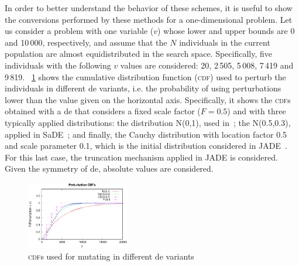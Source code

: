 \documentclass[review,3p]{elsarticle}
\newcommand{\DE}{{\sc de}}
\begin{document}
In order to better understand the behavior of these schemes, it is useful to show the conversions performed by these
methods for a one-dimensional problem.
%
Let us consider a problem with one variable ($v$) whose lower and upper bounds are 0 and 10$\,$000, respectively,
and assume that the $N$ individuals in the current population are almost equidistributed in the search space.
%
Specifically, five individuals with the following $v$ values are considered: 20, 2$\,$505, 5$\,$008, 7$\,$419 and 9$\,$819.
%
\figurename~\ref{fig:random_cdfs} shows the cumulative distribution function (\textsc{cdf}) used to perturb the individuals in different \DE{} variants,
i.e. the probability of using perturbations lower than the value given on the horizontal axis.
%
Specifically, it shows the \textsc{cdf}s obtained with a \DE{} that considers a fixed scale factor ($F = 0.5$) and
with three typically applied distributions: the distribution N(0,1), used in~\cite{Abbass:02}; the N(0.5,0.3), applied in SaDE~\cite{Qin:09}; and
finally, the Cauchy distribution with location factor 0.5 and scale parameter 0.1, which is the initial distribution considered in JADE~\cite{Zhang:09}.
%
For this last case, the truncation mechanism applied in JADE is considered.
%
Given the symmetry of \DE{}, absolute values are considered.

\begin{figure}[!t]
\centering
\includegraphics[width=0.40\textwidth]{images/cdf.eps}
\caption{\textsc{cdf}s used for mutating in different \DE{} variants}
\label{fig:random_cdfs}
\end{figure}
\end{document}
